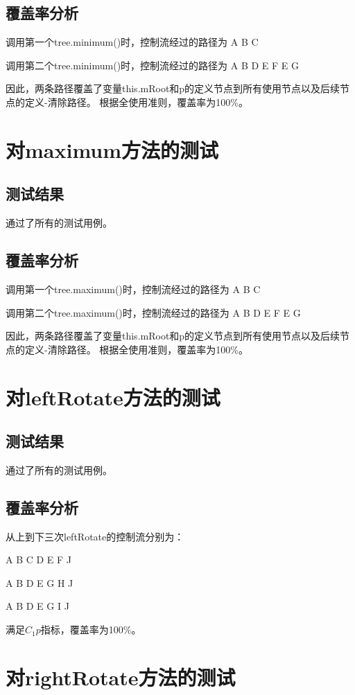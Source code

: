 \documentclass[12pt, a4paper, oneside]{ctexart}
\begin{document}
\subsection{覆盖率分析}
调用第一个tree.minimum()时，控制流经过的路径为 A B C

调用第二个tree.minimum()时，控制流经过的路径为 A B D E F E G

因此，两条路径覆盖了变量this.mRoot和p的定义节点到所有使用节点以及后续节点的定义-清除路径。
根据全使用准则，覆盖率为100\%。

\section{对maximum方法的测试}

\subsection{测试结果}
通过了所有的测试用例。

\subsection{覆盖率分析}
调用第一个tree.maximum()时，控制流经过的路径为 A B C

调用第二个tree.maximum()时，控制流经过的路径为 A B D E F E G

因此，两条路径覆盖了变量this.mRoot和p的定义节点到所有使用节点以及后续节点的定义-清除路径。
根据全使用准则，覆盖率为100\%。

\section{对leftRotate方法的测试}

\subsection{测试结果}
通过了所有的测试用例。

\subsection{覆盖率分析}
从上到下三次leftRotate的控制流分别为：

A B C D E F J

A B D E G H J

A B D E G I J

满足$C_1p$指标，覆盖率为100\%。

\section{对rightRotate方法的测试}
\end{document}
